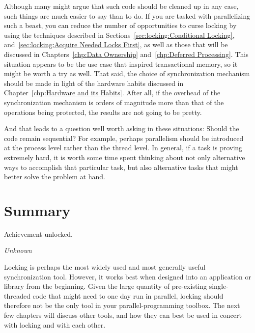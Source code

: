 Although many might argue that such code should be cleaned up in any
case, such things are much easier to say than to do.
If you are tasked with parallelizing such a beast, you can reduce the
number of opportunities to curse locking by using the techniques
described in
Sections~\ref{sec:locking:Conditional Locking},
and~\ref{sec:locking:Acquire Needed Locks First},
as well as those that will be discussed in
Chapters~\ref{chp:Data Ownership}
and~\ref{chp:Deferred Processing}.
This situation appears to be the use case that inspired transactional
memory, so it might be worth a try as well.
That said, the choice of synchronization mechanism should be made in
light of the hardware habits discussed in
Chapter~\ref{chp:Hardware and its Habits}.
After all, if the overhead of the synchronization mechanism is orders of
magnitude more than that of the operations being protected, the results
are not going to be pretty.

And that leads to a question well worth asking in these situations:
Should the code remain sequential?
For example, perhaps parallelism should be introduced at the process level
rather than the thread level.
In general, if a task is proving extremely hard, it is worth some time
spent thinking about not only alternative ways to accomplish that
particular task, but also alternative tasks that might better solve
the problem at hand.

\section{Summary}
\label{sec:locking:Summary}
%
\epigraph{Achievement unlocked.}{\emph{Unknown}}

Locking is perhaps the most widely used and most generally useful
synchronization tool.
However, it works best when designed into an application
or library from the beginning.
Given the large quantity of pre-existing single-threaded code that might
need to one day run in parallel, locking should therefore not be the
only tool in your parallel-programming toolbox.
The next few chapters will discuss other tools, and how they can best
be used in concert with locking and with each other.

